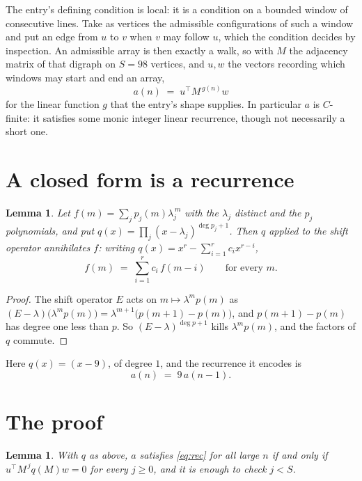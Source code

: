 \documentclass[11pt,a4paper]{article}
\theoremstyle{plain}
\newtheorem{lemma}[theorem]{Lemma}
\theoremstyle{definition}
\begin{document}
The entry's defining condition is local: it is a condition on a bounded window of consecutive lines. Take as vertices the
admissible configurations of such a window and put an edge from $u$ to $v$ when $v$ may
follow $u$, which the condition decides by inspection. An admissible array is then exactly a
walk, so with $M$ the adjacency matrix of that digraph on $S=98$ vertices, and $u,w$ the
vectors recording which windows may start and end an array,
\[
a(n)\;=\;u^{\!\top}M^{\,g(n)}w
\]
for the linear function $g$ that the entry's shape supplies. In particular $a$ is
$C$-finite: it satisfies some monic integer linear recurrence, though not necessarily a short
one.

\section{A closed form is a recurrence}

\begin{lemma}\label{lem:ann}
Let $f(m)=\sum_{j}p_j(m)\lambda_j^{\,m}$ with the $\lambda_j$ distinct and the $p_j$
polynomials, and put $q(x)=\prod_j(x-\lambda_j)^{\deg p_j+1}$. Then $q$ applied to the shift
operator annihilates $f$: writing $q(x)=x^{r}-\sum_{i=1}^{r}c_ix^{r-i}$,
\[
f(m)\;=\;\sum_{i=1}^{r}c_i\,f(m-i)\qquad\text{for every }m.
\]
\end{lemma}

\begin{proof}
The shift operator $E$ acts on $m\mapsto\lambda^{m}p(m)$ as
$(E-\lambda)\bigl(\lambda^{m}p(m)\bigr)=\lambda^{m+1}\bigl(p(m+1)-p(m)\bigr)$, and
$p(m+1)-p(m)$ has degree one less than $p$. So $(E-\lambda)^{\deg p+1}$ kills
$\lambda^{m}p(m)$, and the factors of $q$ commute.
\end{proof}

Here $q(x)=(x-9)$, of degree $1$, and the recurrence it encodes is
\begin{equation}\label{eq:rec}
a(n)\;=\;9\,a(n-1).
\end{equation}

\section{The proof}

\begin{lemma}\label{lem:crit}
With $q$ as above, $a$ satisfies \eqref{eq:rec} for all large $n$ if and only if
$u^{\!\top}M^{\,j}q(M)w=0$ for every $j\ge0$, and it is enough to check $j<S$.
\end{lemma}
\end{document}
